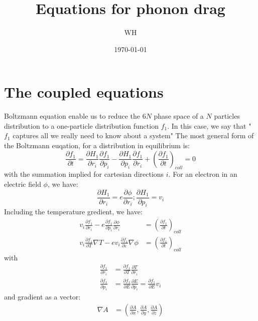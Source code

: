 \documentclass{article}
\newcommand{\pfrac}[2]{\frac{\partial #1}{\partial #2}}
\begin{document}
\title{Equations for phonon drag}
\author{WH}
\date{\today}
\maketitle

\section{The coupled equations}
Boltzmann equation enable us to reduce the $6N$ phase space of 
a $N$ particles distribution to a one-particle distribution function $f_1$.
In this case, we say that "$f_1$ captures all we really need to know about
a system" 
The most general form of the Boltzmann euqation, for a distribution in equilibrium is:
\begin{equation}
    \pfrac{f_1}{t} = \pfrac{H_1}{r_i} \pfrac{f_1}{p_i} - \pfrac{H_1}{p_i} \pfrac{f_1}{r_i} 
                        + \left(\pfrac{f_1}{t}\right)_{coll} = 0  
\end{equation} 
with the summation implied for cartesian directions $i$. 
For an electron in an electric field $\phi$, we have:
\begin{equation}
    \pfrac{H_1}{r_i}=e \pfrac{\phi}{r_i} ; \pfrac{H_1}{p_i} = v_i
\end{equation}
Including the temperature gredient, we have:
\begin{align}
    v_i \pfrac{f_1}{r_i} - e \pfrac{f_1}{p_i}\pfrac{\phi}{r_i} &=\left(\pfrac{f_1}{t}\right)_{coll} \\
    v_i \pfrac{f_1}{T}\nabla T - e v_i \pfrac{f_1}{\varepsilon}\nabla \phi &=\left(\pfrac{f_1}{t}\right)_{coll} 
\end{align}
with 
\begin{align}
    \pfrac{f_1}{r_i} &= \pfrac{f_1}{T} \pfrac{T}{r_i} \\
    \pfrac{f_1}{p_i} &= \pfrac{f_1}{E} \pfrac{E}{p_i} = \pfrac{f_1}{E} v_i 
\end{align}
and gradient as a vector:
\begin{align}
    \nabla A &= \left( \pfrac{A}{x},\pfrac{A}{y},\pfrac{A}{z} \right)
\end{align}
\end{document}

